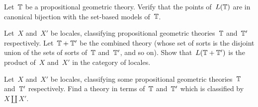 \documentclass{ws-rv9x6}
\begin{document}
{\begin{exercise}%
Let~$\mathbb{T}$ be a propositional geometric theory. Verify that the points
of~$L(\mathbb{T})$ are in canonical bijection with the set-based models of~$\mathbb{T}$.
\end{exercise}

\begin{exercise}\label{ex:products-of-locales}%
Let~$X$ and~$X'$ be locales, classifying propositional geometric
theories~$\mathbb{T}$ and~$\mathbb{T}'$ respectively. Let~$\mathbb{T} + \mathbb{T}'$ be the combined theory
(whose set of sorts is the disjoint union of the sets of sorts of~$\mathbb{T}$
and~$\mathbb{T}'$, and so on). Show that~$L(\mathbb{T} + \mathbb{T}')$ is the product of~$X$
and~$X'$ in the category of locales.
\end{exercise}

\begin{exercise}%
Let~$X$ and~$X'$ be locales, classifying some propositional geometric
theories~$\mathbb{T}$ and~$\mathbb{T}'$ respectively. Find a theory in terms of~$\mathbb{T}$
and~$\mathbb{T}'$ which is classified by~$X \amalg X'$.
\end{exercise}

}
\end{document}
